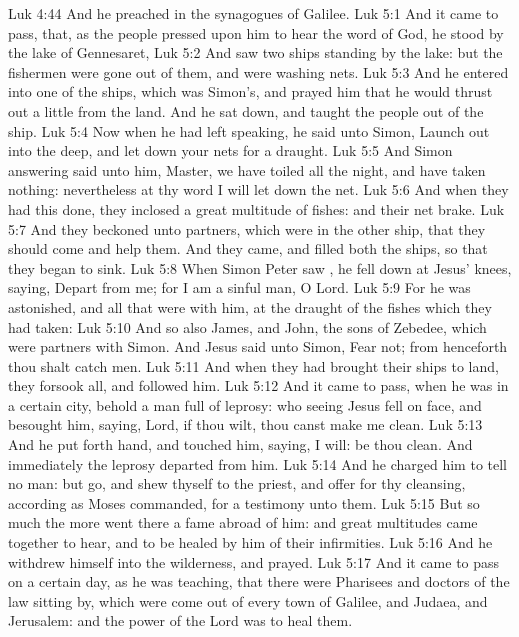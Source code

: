 \vs Luk 4:44 And he preached in the synagogues of Galilee.
\vs Luk 5:1 And it came to pass, that, as the people pressed upon him to hear the word of God, he stood by the lake of Gennesaret,
\vs Luk 5:2 And saw two ships standing by the lake: but the fishermen were gone out of them, and were washing  nets.
\vs Luk 5:3 And he entered into one of the ships, which was Simon's, and prayed him that he would thrust out a little from the land. And he sat down, and taught the people out of the ship.
\vs Luk 5:4 Now when he had left speaking, he said unto Simon, Launch out into the deep, and let down your nets for a draught.
\vs Luk 5:5 And Simon answering said unto him, Master, we have toiled all the night, and have taken nothing: nevertheless at thy word I will let down the net.
\vs Luk 5:6 And when they had this done, they inclosed a great multitude of fishes: and their net brake.
\vs Luk 5:7 And they beckoned unto  partners, which were in the other ship, that they should come and help them. And they came, and filled both the ships, so that they began to sink.
\vs Luk 5:8 When Simon Peter saw , he fell down at Jesus' knees, saying, Depart from me; for I am a sinful man, O Lord.
\vs Luk 5:9 For he was astonished, and all that were with him, at the draught of the fishes which they had taken:
\vs Luk 5:10 And so  also James, and John, the sons of Zebedee, which were partners with Simon. And Jesus said unto Simon, Fear not; from henceforth thou shalt catch men.
\vs Luk 5:11 And when they had brought their ships to land, they forsook all, and followed him.
\vs Luk 5:12 And it came to pass, when he was in a certain city, behold a man full of leprosy: who seeing Jesus fell on  face, and besought him, saying, Lord, if thou wilt, thou canst make me clean.
\vs Luk 5:13 And he put forth  hand, and touched him, saying, I will: be thou clean. And immediately the leprosy departed from him.
\vs Luk 5:14 And he charged him to tell no man: but go, and shew thyself to the priest, and offer for thy cleansing, according as Moses commanded, for a testimony unto them.
\vs Luk 5:15 But so much the more went there a fame abroad of him: and great multitudes came together to hear, and to be healed by him of their infirmities.
\vs Luk 5:16 And he withdrew himself into the wilderness, and prayed.
\vs Luk 5:17 And it came to pass on a certain day, as he was teaching, that there were Pharisees and doctors of the law sitting by, which were come out of every town of Galilee, and Judaea, and Jerusalem: and the power of the Lord was  to heal them.

